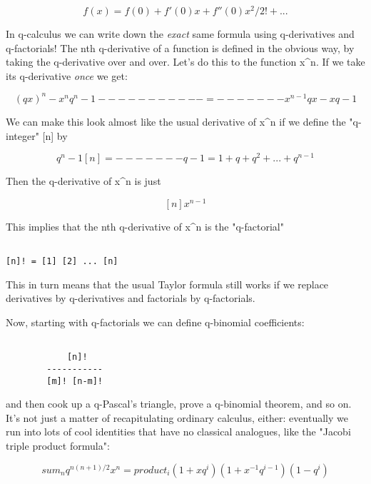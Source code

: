 $$

f(x) = f(0) + f'(0) x + f''(0) x^{2}/2! + ... 
$$
    
In q-calculus we can write down the \emph{exact} same formula using
q-derivatives and q-factorials!  The nth q-derivative of a function is
defined in the obvious way, by taking the q-derivative over and over.  
Let's do this to the function x^{n}.  
If we take its q-derivative \emph{once} we get:


$$

     (qx)^{n} - x^{n}         q^{n} - 1
     -----------   =   ------- x^{n-1} 
       qx - x           q - 1
$$
    
We can make this look almost like the usual derivative of x^{n} if
we define the "q-integer" [n] by


$$

            q^{n} - 1
  [n]  =   -------   
            q - 1

       = 1 + q + q^{2} + ... + q^{n-1}
$$
    
Then the q-derivative of x^{n} is just 


$$

[n] x^{n-1}
$$
    
This implies that the nth q-derivative of x^{n} is the "q-factorial"
 

\begin{verbatim}

[n]! = [1] [2] ... [n] 
\end{verbatim}
    
This in turn means that the usual Taylor formula still works if we
replace derivatives by q-derivatives and factorials by q-factorials.

Now, starting with q-factorials we can define q-binomial coefficients:


\begin{verbatim}

            [n]! 
        -----------
        [m]! [n-m]!
\end{verbatim}
    
and then cook up a q-Pascal's triangle, prove a q-binomial theorem, and 
so on.  It's not just a matter of recapitulating ordinary calculus, 
either: eventually we run into lots of cool identities that have no 
classical analogues, like the "Jacobi triple product formula":


$$

                 sum_{n}  q^{n(n+1)/2} x^{n}  =  

        product_{i}  (1 + xq^{i}) (1 + x^{-1}q^{i-1}) (1 - q^{i}) 
$$
    
